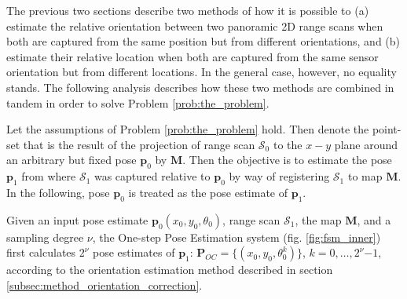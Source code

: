 The previous two sections describe two methods of how it is possible to (a)
estimate the relative orientation between two panoramic 2D range scans when
both are captured from the same position but from different orientations, and
(b) estimate their relative location when both are captured from the same
sensor orientation but from different locations. In the general case, however,
no equality stands. The following analysis describes how these two methods are
combined in tandem in order to solve Problem \ref{prob:the_problem}.

Let the assumptions of Problem \ref{prob:the_problem} hold. Then denote the
point-set that is the result of the projection of range scan $\mathcal{S}_0$ to
the $x-y$ plane around an arbitrary but fixed pose $\bm{p}_0$ by $\bm{M}$. Then
the objective is to estimate the pose $\bm{p}_1$ from where $\mathcal{S}_1$ was
captured relative to $\bm{p}_0$ by way of registering $\mathcal{S}_1$ to map
$\bm{M}$. In the following, pose $\bm{p}_0$ is treated as the pose estimate of
$\bm{p}_1$.


Given an input pose estimate $\bm{p}_0(x_0, y_0, \theta_0)$, range scan
$\mathcal{S}_1$, the map $\bm{M}$, and a sampling degree $\nu$, the One-step
Pose Estimation system (fig. \ref{fig:fsm_inner}) first calculates $2^\nu$ pose
estimates of $\bm{p}_1$: $\bm{P}_{OC} = \{(x_0, y_0, \theta_0^k)\}$,
$k = 0,\dots,2^\nu$$-$$1$, according to the orientation estimation method
described in section \ref{subsec:method_orientation_correction}.

